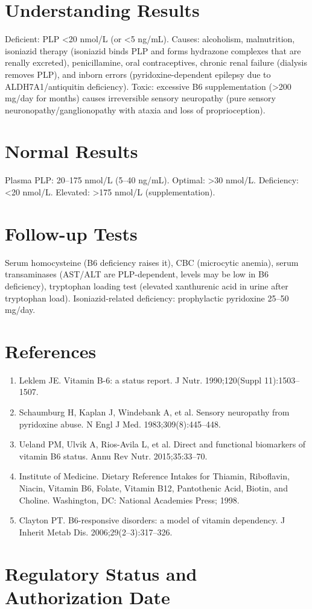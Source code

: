 \section*{Understanding Results}
Deficient: PLP <20 nmol/L (or <5 ng/mL). Causes: alcoholism, malnutrition, isoniazid therapy (isoniazid binds PLP and forms hydrazone complexes that are renally excreted), penicillamine, oral contraceptives, chronic renal failure (dialysis removes PLP), and inborn errors (pyridoxine-dependent epilepsy due to ALDH7A1/antiquitin deficiency). Toxic: excessive B6 supplementation (>200 mg/day for months) causes irreversible sensory neuropathy (pure sensory neuronopathy/ganglionopathy with ataxia and loss of proprioception).
\section*{Normal Results}
Plasma PLP: 20--175 nmol/L (5--40 ng/mL). Optimal: >30 nmol/L. Deficiency: <20 nmol/L. Elevated: >175 nmol/L (supplementation).
\section*{Follow-up Tests}
Serum homocysteine (B6 deficiency raises it), CBC (microcytic anemia), serum transaminases (AST/ALT are PLP-dependent, levels may be low in B6 deficiency), tryptophan loading test (elevated xanthurenic acid in urine after tryptophan load). Isoniazid-related deficiency: prophylactic pyridoxine 25--50 mg/day.
\section*{References}
\begin{enumerate}
  \item Leklem JE. Vitamin B-6: a status report. J Nutr. 1990;120(Suppl 11):1503--1507.
  \item Schaumburg H, Kaplan J, Windebank A, et al. Sensory neuropathy from pyridoxine abuse. N Engl J Med. 1983;309(8):445--448.
  \item Ueland PM, Ulvik A, Rios-Avila L, et al. Direct and functional biomarkers of vitamin B6 status. Annu Rev Nutr. 2015;35:33--70.
  \item Institute of Medicine. Dietary Reference Intakes for Thiamin, Riboflavin, Niacin, Vitamin B6, Folate, Vitamin B12, Pantothenic Acid, Biotin, and Choline. Washington, DC: National Academies Press; 1998.
  \item Clayton PT. B6-responsive disorders: a model of vitamin dependency. J Inherit Metab Dis. 2006;29(2--3):317--326.
\end{enumerate}
\clearpage
\section*{Regulatory Status and Authorization Date}

\clearpage
